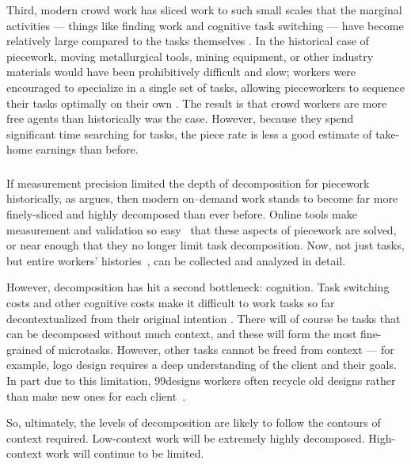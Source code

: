 \documentclass[trackingWork]{subfiles}
\begin{document}
Third, modern crowd work has sliced work to such small scales that the marginal activities
--- things like finding work and cognitive task switching ---
have become relatively large compared to the tasks themselves
\cite{taskSearch}.
In the historical case of piecework,
moving metallurgical tools, mining equipment, or
other industry materials would have been prohibitively difficult and slow;
workers were encouraged to specialize in a single set of tasks,
allowing pieceworkers to sequence their tasks optimally on their own
\cite{hart2013rise}.
The result is that crowd workers are more free agents than historically was the case.
However, because they spend significant time searching for tasks, the piece rate is less a good estimate of take-home earnings than before.

 



\subsubsection{\implication}
If measurement precision limited the depth of decomposition for piecework historically, as \citeauthor{10.2307/23702539} argues, then modern on--demand work stands to become far more finely-sliced and highly decomposed than ever before.
Online tools make measurement and validation so easy~\cite{rzeszotarski2011instrumenting} that these aspects of piecework are solved, or near enough that they no longer limit task decomposition.
Now, not just tasks, but entire workers' histories~\cite{hata2017glimpse}, can be collected and analyzed in detail.

However, decomposition has hit a second bottleneck: cognition. 
Task switching costs and other cognitive costs make it difficult to work tasks so far decontextualized from their original intention \cite{delayAndOrderLasecki}.
There will of course be tasks that can be decomposed without much context, and these will form the most fine-grained of microtasks.
However, other tasks cannot be freed from context --- for example, logo design requires a deep understanding of the client and their goals.
In part due to this limitation, 99designs workers often recycle old designs rather than make new ones for each client~\cite{araujo201399designs}.

So, ultimately, the levels of decomposition are likely to follow the contours of context required. Low-context work will be extremely highly decomposed. High-context work will continue to be limited.


\onlyinsubfile{
  \balance{}
  \printbibliography
}
\end{document}
